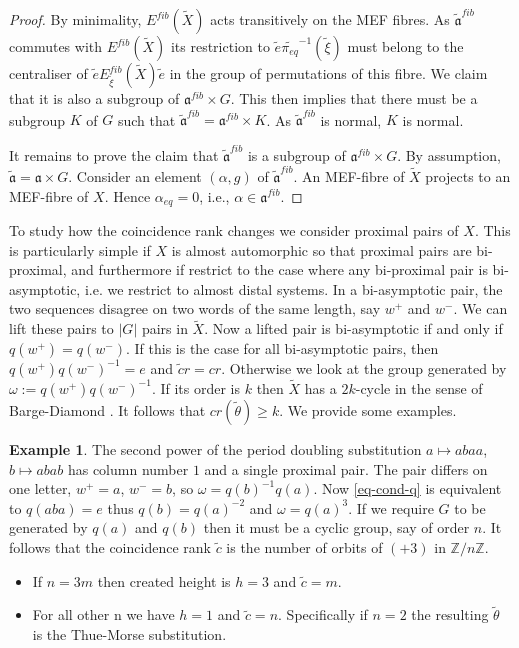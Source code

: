 \documentclass[12pt]{amsart}
\theoremstyle{definition}
\newtheorem{example}[theorem]{Example}
\numberwithin{equation}{section}
\newcommand{\Z}{\mathbb Z}
\newcommand{\aut}{{\mathfrak a}}
\newcommand{\pe}{\pi_{eq}}
\newcommand{\tpe}{\widetilde{\pe}}
\newcommand{\Ef}{E^{fib}}
\begin{document}
\begin{proof}
By minimality, $\Ef(\tilde X)$ acts transitively on the MEF fibres. As $\tilde\aut^{fib}$ commutes with $\Ef(\tilde X)$ its restriction to $\tilde e\tpe^{-1}(\tilde \xi)$ must belong to the centraliser of $\tilde e\Ef_{\tilde \xi}(\tilde X)\tilde e$ in the group of permutations of this fibre. 
We claim that it is also a subgroup of $\aut^{fib}\times G$. This then implies that there must be  a subgroup $K$ of $G$ such that $\tilde\aut^{fib} = \aut^{fib}\times K$. As $\tilde\aut^{fib}$ is normal, $K$ is normal.  

It remains to prove the claim that $\tilde\aut^{fib}$ is a subgroup of $\aut^{fib}\times G$.  By assumption, $\tilde\aut=  \aut\times G$.
Consider an element $(\alpha,g)$ of 
$ \tilde\aut^{fib}$. An MEF-fibre of $\tilde X$ projects to an 
MEF-fibre of $X$. Hence $\alpha_{eq}=0$, i.e., $\alpha\in\aut^{fib}$.
\end{proof}
To study how the coincidence  rank changes we consider proximal pairs of $X$. This is particularly simple if $X$ is almost automorphic so that proximal pairs are bi-proximal, and furthermore if restrict to the case where any bi-proximal pair is  bi-asymptotic, i.e. we restrict to almost distal systems.
In a bi-asymptotic pair, the two sequences disagree on two words of the same length, say $w^+$ and $w^-$. We can lift these pairs to $|G|$ pairs in $\tilde X$. Now a lifted pair is bi-asymptotic if and only if $q(w^+) = q(w^-)$. If this is the case for all bi-asymptotic pairs, then $q(w^+)q(w^-)^{-1}=e$ and $\tilde cr = cr$. Otherwise we look at the group generated by $\omega:=q(w^+)q(w^-)^{-1}$. If its order is $k$ then $\tilde X$ has a $2k$-cycle in the sense of Barge-Diamond \cite{Barge-Diamond:2007}. It follows that $cr(\tilde\theta) \geq k$. 
We provide some examples.
\begin{example}
The second power of the period doubling substitution $a\mapsto abaa$, $b\mapsto abab$ has column number $1$ and a single proximal pair. The pair differs on one letter,  $w^+=a$, $w^-=b$, so $\omega = q(b)^{-1} q(a)$. Now \eqref{eq-cond-q} is equivalent to $q(aba) = e$ thus $q(b) = q(a)^{-2}$ and $\omega=q(a)^3$. If we require $G$ to be generated by $q(a)$ and $q(b)$ then it must be a cyclic group, say of order $n$. It follows that the coincidence rank $\tilde c$ is the number of orbits of $(+3)$ in $\Z/n\Z$.
\begin{itemize}
 \item If $n=3m$ then created height is $h=3$ and $\tilde c = m$.
 \item For all other n we have $h=1$ and $\tilde c = n$. Specifically  if $n=2$ the resulting $\tilde \theta$ is the Thue-Morse substitution. 
\end{itemize}
\end{example}
\end{document}
